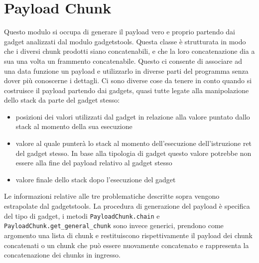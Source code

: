 \section{Payload Chunk}

Questo modulo si occupa di generare il payload vero e proprio partendo
dai gadget analizzati dal modulo gadgetstools. Questa classe è
strutturata in modo che i diversi chunk prodotti siano concatenabili,
e che la loro concatenazione dia a sua una volta un frammento
concatenabile. Questo ci consente di associare ad una data funzione un
payload e utilizzarlo in diverse parti del programma senza dover più
conoscerne i dettagli. Ci sono diverse cose da tenere in conto quando
si costruisce il payload partendo dai gadgets, quasi tutte legate alla
manipolazione dello stack da parte del gadget stesso:

\begin{itemize}

  \item posizioni dei valori utilizzati dal gadget in relazione alla
    valore puntato dallo stack al momento della sua esecuzione

  \item valore al quale punterà lo stack al momento dell'esecuzione
    dell'istruzione ret del gadget stesso. In base alla tipologia di
    gadget questo valore potrebbe non essere alla fine del payload
    relativo al gadget stesso
    
  \item valore finale dello stack dopo l'esecuzione del gadget

\end{itemize}

Le informazioni relative alle tre problematiche descritte sopra
vengono estrapolate dal gadgetstools. La procedura di generazione del
payload è specifica del tipo di gadget, i metodi
\lstinline{PayloadChunk.chain} e
\lstinline{PayloadChunk.get_general_chunk} sono invece generici,
prendono come argomento una lista di chunk e restituiscono
rispettivamente il payload dei chunk concatenati o un chunk che può
essere nuovamente concatenato e rappresenta la concatenazione dei
chunks in ingresso.


